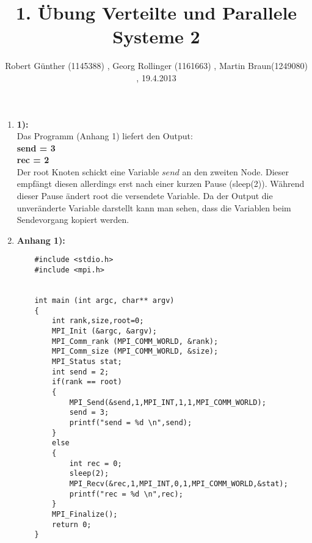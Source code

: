 ﻿\documentclass[10pt,a4paper]{article} [2003/01/01]
\title{1. Übung Verteilte und Parallele Systeme 2}
\author{ Robert Günther (1145388) , Georg Rollinger (1161663) , Martin Braun(1249080) , 19.4.2013}
\date{}
\begin{document}
\maketitle
\begin{enumerate}

\item[]{\textbf{1):} \\
   Das Programm (Anhang 1) liefert den Output:\\
   \textbf{
   send = 3\\
	rec = 2}\\
	Der root Knoten schickt eine Variable $send$ an den zweiten Node. Dieser empfängt diesen allerdings erst nach einer kurzen Pause (sleep(2)). Während dieser Pause ändert root die versendete Variable. Da der Output die unveränderte Variable darstellt kann man sehen, dass die Variablen beim Sendevorgang kopiert werden.


}
\newpage
\item[]{\textbf{Anhang 1):}
	\begin{lstlisting}
	#include <stdio.h>
	#include <mpi.h>


	int main (int argc, char** argv)
	{
		int rank,size,root=0;
		MPI_Init (&argc, &argv);	
  		MPI_Comm_rank (MPI_COMM_WORLD, &rank);	
  		MPI_Comm_size (MPI_COMM_WORLD, &size);	
		MPI_Status stat;
		int send = 2;
  		if(rank == root)
  		{
  			MPI_Send(&send,1,MPI_INT,1,1,MPI_COMM_WORLD);
  			send = 3;
  			printf("send = %d \n",send);
  		}
  		else
  		{
	  		int rec = 0;
  			sleep(2);
  			MPI_Recv(&rec,1,MPI_INT,0,1,MPI_COMM_WORLD,&stat);
  			printf("rec = %d \n",rec);
  		}
  		MPI_Finalize();
		return 0;
	}
	\end{lstlisting}
}

\end{enumerate}
\end{document}

